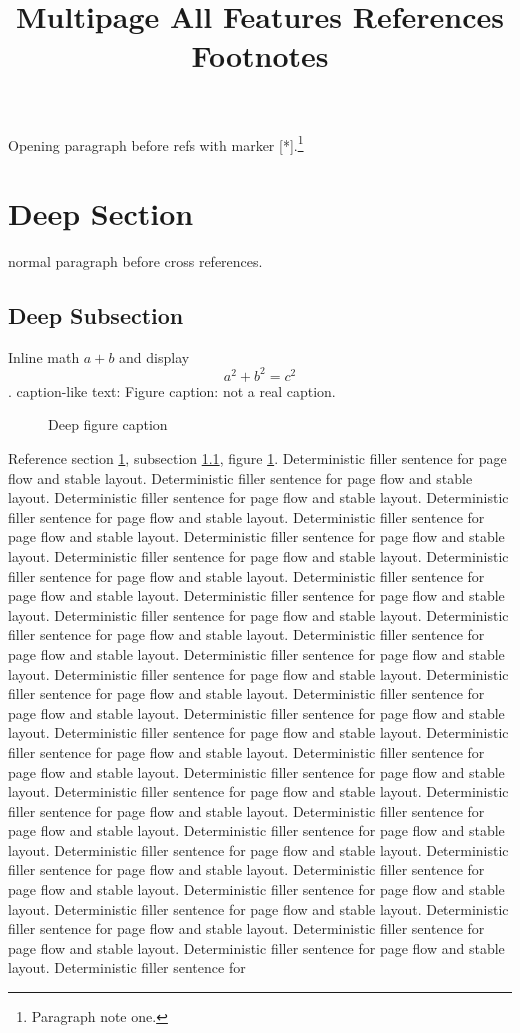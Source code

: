 \documentclass{article}
\begin{document}
\title{Multipage All Features References Footnotes}\maketitle
Opening paragraph before refs with marker [*].\footnote{Paragraph note one.}\section{Deep Section}\label{sec:deep} normal paragraph before cross references.\subsection{Deep Subsection}\label{sub:deep} Inline math $a+b$ and display $$a^2+b^2=c^2$$. caption-like text: Figure caption: not a real caption.\begin{figure}[h]\centering{}\caption{Deep figure caption}\label{fig:deep}\end{figure} Reference section \ref{sec:deep}, subsection \ref{sub:deep}, figure \ref{fig:deep}. Deterministic filler sentence for page flow and stable layout. Deterministic filler sentence for page flow and stable layout. Deterministic filler sentence for page flow and stable layout. Deterministic filler sentence for page flow and stable layout. Deterministic filler sentence for page flow and stable layout. Deterministic filler sentence for page flow and stable layout. Deterministic filler sentence for page flow and stable layout. Deterministic filler sentence for page flow and stable layout. Deterministic filler sentence for page flow and stable layout. Deterministic filler sentence for page flow and stable layout. Deterministic filler sentence for page flow and stable layout. Deterministic filler sentence for page flow and stable layout. Deterministic filler sentence for page flow and stable layout. Deterministic filler sentence for page flow and stable layout. Deterministic filler sentence for page flow and stable layout. Deterministic filler sentence for page flow and stable layout. Deterministic filler sentence for page flow and stable layout. Deterministic filler sentence for page flow and stable layout. Deterministic filler sentence for page flow and stable layout. Deterministic filler sentence for page flow and stable layout. Deterministic filler sentence for page flow and stable layout. Deterministic filler sentence for page flow and stable layout. Deterministic filler sentence for page flow and stable layout. Deterministic filler sentence for page flow and stable layout. Deterministic filler sentence for page flow and stable layout. Deterministic filler sentence for page flow and stable layout. Deterministic filler sentence for page flow and stable layout. Deterministic filler sentence for page flow and stable layout. Deterministic filler sentence for page flow and stable layout. Deterministic filler sentence for page flow and stable layout. Deterministic filler sentence for page flow and stable layout. Deterministic filler sentence for page flow and stable layout. Deterministic filler sentence for page flow and stable layout. Deterministic filler sentence for page flow and stable layout. Deterministic filler sentence for 
\end{document}

